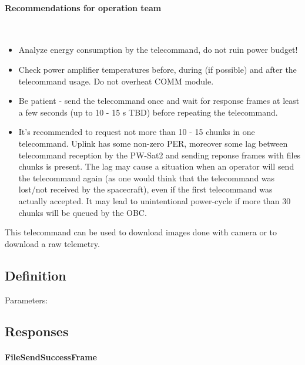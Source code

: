 \paragraph{Recommendations for operation team} \mbox{} \\
\begin{itemize}
    \item Analyze energy consumption by the telecommand, do not ruin power budget!
    \item Check power amplifier temperatures before, during (if possible) and after the telecommand usage. Do not overheat COMM module.
    \item Be patient - send the telecommand once and wait for response frames at least a few seconds (up to 10 - 15 s TBD) before repeating the telecommand.
    \item It's recommended to request not more than 10 - 15 chunks in one telecommand. Uplink has some non-zero PER, moreover some lag between telecommand reception by
    the PW-Sat2 and sending reponse frames with files chunks is present. The lag may cause a situation when an operator will send the telecommand again (as one would think that the telecommand was lost/not received by the spacecraft), even if the first telecommand was actually accepted. It may lead to unintentional power-cycle if more than 30 chunks will be queued by the OBC.
\end{itemize}
This telecommand can be used to download images done with camera or to download a raw telemetry.

\subsection{Definition}

Parameters: 

\begin{tcarglist}
\end{tcarglist}

\subsection{Responses}

\paragraph{FileSendSuccessFrame}

